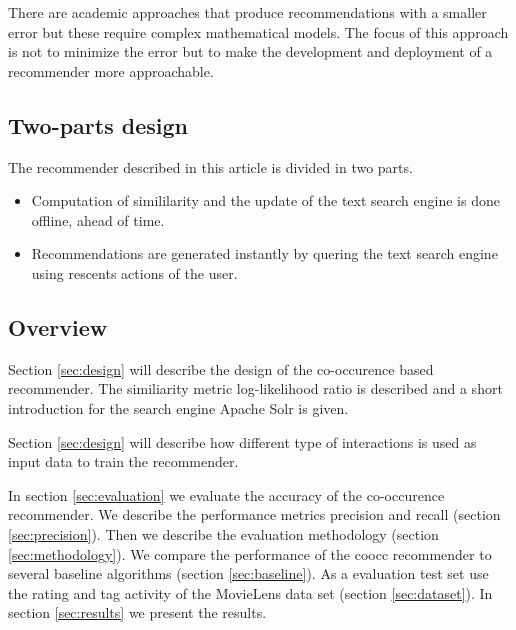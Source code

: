 There are academic approaches that produce recommendations with a smaller error but these require complex mathematical models. The focus of this approach is not to minimize the error but to make the development and deployment of a recommender more approachable.

\subsection{Two-parts design}

The recommender described in this article is divided in two parts.
\begin{itemize}
\item Computation of simililarity and the update of the text search engine is done offline, ahead of time.
\item Recommendations are generated instantly by quering the text search engine using rescents actions of the user.

\end{itemize}

\subsection{Overview}

Section \ref{sec:design} will describe the design of the co-occurence based recommender. The similiarity metric log-likelihood ratio is described and a short introduction for the search engine Apache Solr is given.

Section \ref{sec:design} will describe how different type of interactions is used as input data to train the recommender.

In section \ref{sec:evaluation} we evaluate the accuracy of the co-occurence recommender. We describe the performance metrics \gls{precision} and \gls{recall} (section \ref{sec:precision}). Then we describe the evaluation methodology (section \ref{sec:methodology}). We compare the performance of the \gls{coocc} recommender to several baseline algorithms (section \ref{sec:baseline}). As a evaluation test set use the rating and tag activity of the MovieLens data set (section \ref{sec:dataset}). In section \ref{sec:results} we present the results.